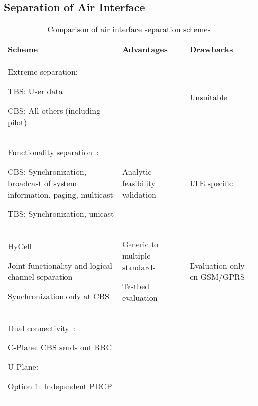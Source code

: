 \documentclass[12pt, draftclsnofoot,onecolumn]{IEEEtran}
\makeatletter
\let\savespace\@minipagetrue
\makeatother
\begin{document}
\subsection{Separation of Air Interface}

\begin{table}[!t]
  \centering
  \caption{Comparison of air interface separation schemes}
  \label{tab:sep}
  \begin{tabularx}{\textwidth}{|X|X|X|}
    \hline
    Scheme & Advantages & Drawbacks \\
    \hline
    \savespace
    Extreme separation:
    \begin{compactitem}
    \item TBS: User data
    \item CBS: All others (including pilot)
    \end{compactitem}
    & -- & Unsuitable \\
    \hline
    \savespace
    Functionality separation~\cite{xu2013functionality}:
    \begin{compactitem}
    \item CBS: Synchronization, broadcast of system information, paging, multicast
    \item TBS: Synchronization, unicast
    \end{compactitem}
    & Analytic feasibility
    validation & LTE specific \\
    \hline
    \savespace
    HyCell~\cite{zhao2015hycell}
    \begin{compactitem}
    \item Joint functionality and logical channel separation
    \item Synchronization only at CBS
    \end{compactitem}
    & \savespace
    \begin{compactitem}
    \item Generic to multiple standards
    \item Testbed evaluation
    \end{compactitem}
    & Evaluation only on GSM/GPRS \\
    \hline
    \savespace
    Dual connectivity~\cite{3gppdcr12}:
    \begin{compactitem}
    \item C-Plane: CBS sends out RRC
    \item U-Plane:
      \begin{compactitem}
      \item Option 1: Independent PDCP

\end{compactitem}
\end{compactitem}
\end{tabularx}
\end{table}
\end{document}
